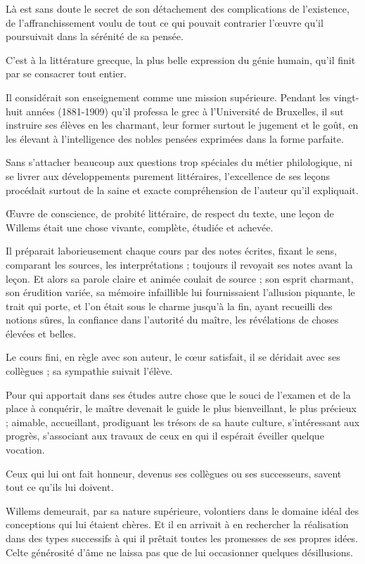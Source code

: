\documentclass{book}%
\begin{document}
Là est sans doute le secret de son détachement des complications de l'existence, de l'affranchissement voulu de tout ce qui pouvait contrarier l'œuvre qu'il poursuivait dans la sérénité de sa pensée. 

C'est à la littérature grecque, la plus belle expression du génie humain, qu'il finit par se consacrer tout entier. 

Il considérait son enseignement comme une mission supérieure. Pendant les vingt-huit années (1881-1909) qu'il professa le grec à l'Université de Bruxelles, il sut instruire ses élèves en les charmant, leur former surtout le jugement et le goût, en les élevant à l'intelligence des nobles pensées exprimées dans la forme parfaite.

Sans s'attacher beaucoup aux questions trop spéciales du métier philologique, ni se livrer aux développements purement littéraires, l'excellence de ses leçons procédait surtout de la saine et exacte compréhension de l'auteur qu'il expliquait. 

Œuvre de conscience, de probité littéraire, de respect du texte, une leçon de Willems était une chose vivante, complète, étudiée et achevée. 

Il préparait laborieusement chaque cours par des notes écrites, fixant le sens, comparant les sources, les interprétations ; toujours il revoyait ses notes avant la leçon. Et alors sa parole claire et animée coulait de source ; son esprit charmant, son érudition variée, sa mémoire infaillible lui fournissaient l'allusion piquante, le trait qui porte, et l'on était sous le charme jusqu'à la fin, ayant recueilli des notions sûres, la confiance dans l'autorité du maître, les révélations de choses élevées et belles. 

Le cours fini, en règle avec son auteur, le cœur satisfait, il se déridait avec ses collègues ; sa sympathie suivait l'élève. 

Pour qui apportait dans ses études autre chose que le souci de l'examen et de la place à conquérir, le maître devenait le guide le plus bienveillant, le plus précieux ; aimable, accueillant, prodiguant les trésors de sa haute culture, s'intéressant aux progrès, s'associant aux travaux de ceux en qui il espérait éveiller quelque vocation. 

Ceux qui lui ont fait honneur, devenus ses collègues ou ses successeurs, savent tout ce qu'ils lui doivent. 

Willems demeurait, par sa nature supérieure, volontiers dans le domaine idéal des conceptions qui lui étaient chères. 
Et il en arrivait à en rechercher la réalisation dans des types successifs à qui il prêtait toutes les promesses de ses propres idées. Celte générosité d'âme ne laissa pas que de lui occasionner quelques désillusions. 
\end{document}
